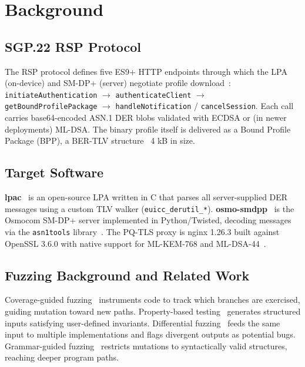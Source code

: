 \documentclass[final,3p,times,twocolumn]{elsarticle}
\begin{document}
\section{Background}\label{sec:background}

\subsection{SGP.22 RSP Protocol}

The RSP protocol defines five ES9+ HTTP endpoints through which the LPA (on-device)
and SM-DP+ (server) negotiate profile download~\cite{gsma_sgp22}:
\texttt{initiateAuthentication} $\rightarrow$
\texttt{authenticateClient} $\rightarrow$
\texttt{getBoundProfilePackage} $\rightarrow$
\texttt{handleNotification} / \texttt{cancelSession}.
Each call carries base64-encoded ASN.1 DER blobs validated with ECDSA or (in newer
deployments) ML-DSA.
The binary profile itself is delivered as a Bound Profile Package (BPP), a BER-TLV
structure ~4 kB in size.

\subsection{Target Software}

\textbf{lpac}~\cite{lpac} is an open-source LPA written in C that parses all
server-supplied DER messages using a custom TLV walker (\texttt{euicc\_derutil\_*}).
\textbf{osmo-smdpp}~\cite{osmocom} is the Osmocom SM-DP+ server implemented
in Python/Twisted, decoding messages via the \texttt{asn1tools}
library~\cite{asn1tools}.
The PQ-TLS proxy is nginx 1.26.3 built against OpenSSL 3.6.0 with native support
for ML-KEM-768 and ML-DSA-44~\cite{openssl_pqc}.

\subsection{Fuzzing Background and Related Work}

Coverage-guided fuzzing~\cite{aflpp,libfuzzer} instruments code to track
which branches are exercised, guiding mutation toward new paths.
Property-based testing~\cite{hypothesis} generates structured inputs
satisfying user-defined invariants.
Differential fuzzing~\cite{differential_testing} feeds the same input to multiple
implementations and flags divergent outputs as potential bugs.
Grammar-guided fuzzing~\cite{grammarfuzz} restricts mutations to syntactically
valid structures, reaching deeper program paths.
\end{document}
